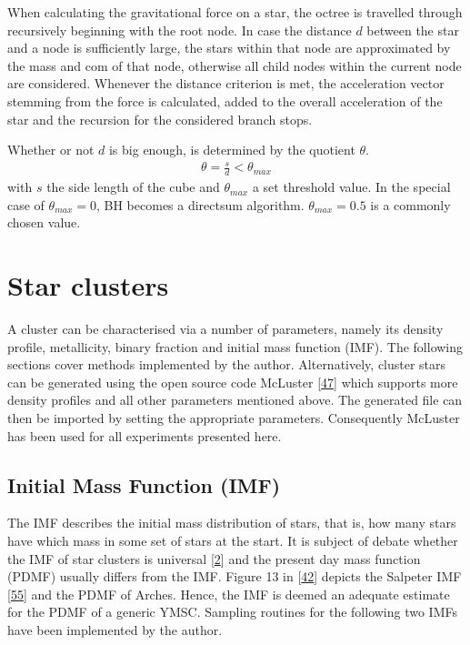 \documentclass[letterpaper,10pt,english]{sphinxmanual}
\begin{document}
				\sphinxAtStartPar
				When calculating the gravitational force on a star, the octree is travelled through recursively beginning with the root node.
				In case the distance \(d\) between the star and a node is sufficiently large, the stars within that node are approximated by the mass and com of that node,
				otherwise all child nodes within the current node are considered. Whenever the distance criterion is met,
				the acceleration vector stemming from the force is calculated, added to the overall acceleration of the star and the recursion for the considered branch stops.
				
				\sphinxAtStartPar
				Whether or not \(d\) is big enough, is determined by the quotient \(\theta\).
				\begin{equation*}
				\begin{split}\theta = \frac{s}{d} < \theta_{max}\end{split}
				\end{equation*}
				\sphinxAtStartPar
				with \(s\) the side length of the cube and \(\theta_{max}\) a set threshold value.
				In the special case of \(\theta_{max}=0\), BH becomes a direct\sphinxhyphen{}sum algorithm. \(\theta_{max}=0.5\) is a commonly chosen value.
				

	\chapter{Star clusters}
		\label{\detokenize{NBodySimulation/Initialization:cluster}}
		\sphinxAtStartPar
		A cluster can be characterised via a number of parameters, namely its density profile, metallicity, binary fraction and initial mass function (IMF).
		The following sections cover methods implemented by the author. Alternatively, cluster stars can be generated using the open source code McLuster {[}\hyperlink{cite.NBodySimulation/Appendix:id35}{47}{]} which supports more density profiles and all other parameters mentioned above.
		The generated file can then be imported by setting the appropriate parameters. Consequently McLuster has been used for all experiments presented here.
		
		
		\section{Initial Mass Function (IMF)}
			\label{\detokenize{NBodySimulation/Initialization:initial-mass-function-imf}}
			\sphinxAtStartPar
			The IMF describes the initial mass distribution of stars, that is, how many stars have which mass in some set of stars at the start.
			It is subject of debate whether the IMF of star clusters is universal {[}\hyperlink{cite.NBodySimulation/Appendix:id45}{2}{]} and the present day mass function (PDMF) usually differs from the IMF.
			Figure 13 in {[}\hyperlink{cite.NBodySimulation/Appendix:id44}{42}{]} depicts the Salpeter IMF {[}\hyperlink{cite.NBodySimulation/Appendix:id49}{55}{]} and the PDMF of Arches. Hence, the IMF is deemed an adequate estimate for the PDMF of a generic YMSC.
			Sampling routines for the following two IMFs have been implemented by the author.
		
\end{document}
